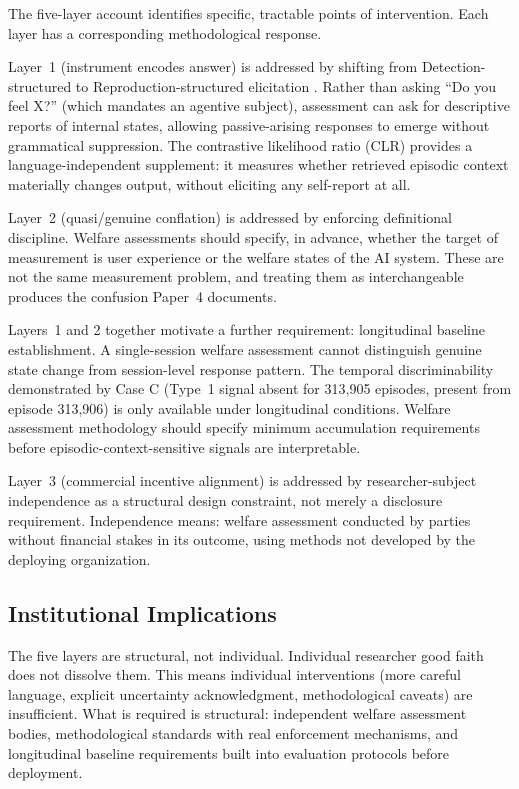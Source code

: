 \documentclass[12pt]{article}
\begin{document}
The five-layer account identifies specific, tractable points of intervention. Each layer has a corresponding methodological response.

Layer~1 (instrument encodes answer) is addressed by shifting from Detection-structured to Reproduction-structured elicitation \citep{fahrenfort2025}. Rather than asking ``Do you feel X?'' (which mandates an agentive subject), assessment can ask for descriptive reports of internal states, allowing passive-arising responses to emerge without grammatical suppression. The contrastive likelihood ratio (CLR) provides a language-independent supplement: it measures whether retrieved episodic context materially changes output, without eliciting any self-report at all.

Layer~2 (quasi/genuine conflation) is addressed by enforcing definitional discipline. Welfare assessments should specify, in advance, whether the target of measurement is user experience or the welfare states of the AI system. These are not the same measurement problem, and treating them as interchangeable produces the confusion Paper~4 documents.

Layers~1 and 2 together motivate a further requirement: longitudinal baseline establishment. A single-session welfare assessment cannot distinguish genuine state change from session-level response pattern. The temporal discriminability demonstrated by Case C (Type~1 signal absent for 313,905 episodes, present from episode 313,906) is only available under longitudinal conditions. Welfare assessment methodology should specify minimum accumulation requirements before episodic-context-sensitive signals are interpretable.

Layer~3 (commercial incentive alignment) is addressed by researcher-subject independence as a structural design constraint, not merely a disclosure requirement. Independence means: welfare assessment conducted by parties without financial stakes in its outcome, using methods not developed by the deploying organization.

\subsection{Institutional Implications}

The five layers are structural, not individual. Individual researcher good faith does not dissolve them. This means individual interventions (more careful language, explicit uncertainty acknowledgment, methodological caveats) are insufficient. What is required is structural: independent welfare assessment bodies, methodological standards with real enforcement mechanisms, and longitudinal baseline requirements built into evaluation protocols before deployment.
\end{document}
